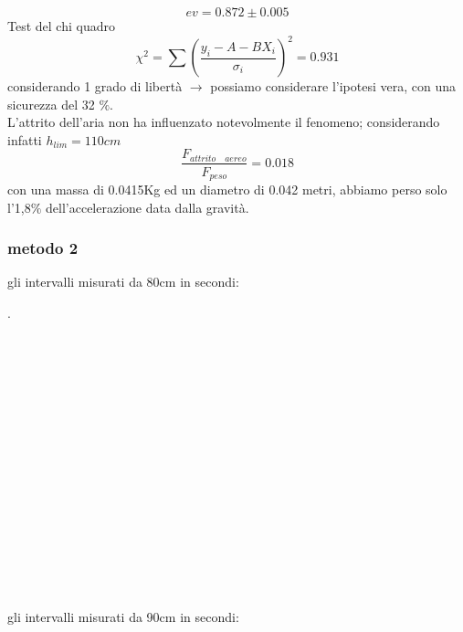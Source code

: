 \documentclass[a4paper]{article}
\theoremstyle{definition}
\begin{document}
	\[ev = 0.872 \pm 0.005\]
\noindent Test del chi quadro\\
\[\chi ^{2} = \sum \left ( \frac{y_{i}-A-BX_{i}}{\sigma_{i}} \right )^{2} = 0.931\]
\noindent considerando 1 grado di libertà \(\rightarrow \)  possiamo considerare l'ipotesi vera, con una sicurezza del 32 \(\%\).\\
L'attrito dell'aria non ha influenzato notevolmente il fenomeno; considerando infatti \(h_{lim} = 110 cm\)
\[\frac{F_{attrito \quad aereo}}{F_{peso}} = 0.018\]
con una massa di 0.0415Kg ed un diametro di 0.042 metri, abbiamo perso solo l'1,8\(\%\) dell'accelerazione data dalla gravità.
	\subsubsection*{metodo 2}
	gli intervalli misurati da 80cm in secondi:
	\begin{figure}[!h]
	\end{figure}
	.\\\\\\\\\\\\\\\\\\\\\\\\\\\\\\\\\\
	\noindent gli intervalli misurati da 90cm in secondi:
	
\end{document}
